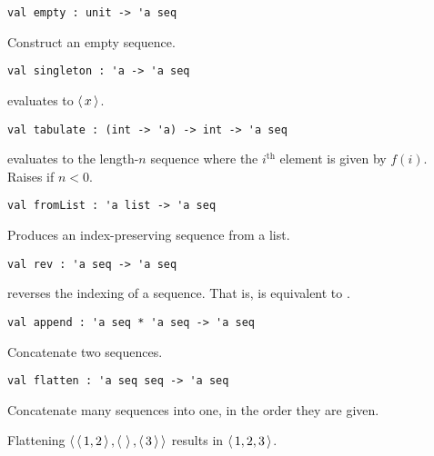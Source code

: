 \begin{gram}[empty]
\label{gr:empty}
\begin{verbatim}
val empty : unit -> 'a seq
\end{verbatim}
Construct an empty sequence.
\end{gram}

\begin{gram}[singleton]
\label{gr:singleton}
\begin{verbatim}
val singleton : 'a -> 'a seq
\end{verbatim}
 evaluates to $\left\langle\, x \,\right\rangle$.
\end{gram}

\begin{gram}[tabulate]
\label{gr:tabulate}
\begin{verbatim}
val tabulate : (int -> 'a) -> int -> 'a seq
\end{verbatim}
 evaluates to the length-$n$ sequence where the $i^\text{th}$
element is given by $f(i)$. Raises  if $n < 0$.
\end{gram}

\begin{gram}[fromList]
\label{gr:fromList}
\begin{verbatim}
val fromList : 'a list -> 'a seq
\end{verbatim}
Produces an index-preserving sequence from a list.
\end{gram}

\begin{gram}[rev]
\label{gr:rev}
\begin{verbatim}
val rev : 'a seq -> 'a seq
\end{verbatim}
 reverses the indexing of a sequence. That is, 
is equivalent to .
\end{gram}

\begin{gram}[append]
\label{gr:append}
\begin{verbatim}
val append : 'a seq * 'a seq -> 'a seq
\end{verbatim}
Concatenate two sequences.
\end{gram}

\begin{flex}
\begin{gram}[flatten]
\label{grm:seq-interface::flatten}
\begin{verbatim}
val flatten : 'a seq seq -> 'a seq
\end{verbatim}
Concatenate many sequences into one, in the order they are given.
\end{gram}

\begin{example}
\label{xmpl:seq-interface::flattening}
Flattening $\left\langle\, \left\langle\, 1,2 \,\right\rangle,\left\langle\,  \,\right\rangle,\left\langle\, 3 \,\right\rangle \,\right\rangle$ results in $\left\langle\, 1,2,3 \,\right\rangle$.
\end{example}
\end{flex}

